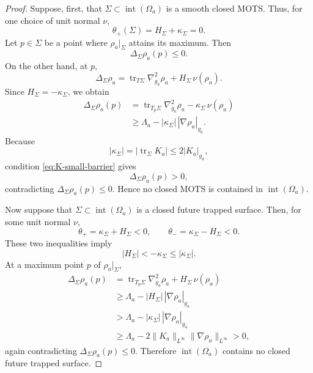 \documentclass{amsart}
\begin{document}
{\begin{proof}
\noindent Suppose, first, that \(\Sigma\subset\operatorname{int}(\Omega_a)\) is a
smooth closed MOTS. Thus, for one choice of unit normal \(\nu\),
\[
        \theta_+(\Sigma)
        =
        H_\Sigma+\kappa_\Sigma
        =
        0.
\]
Let \(p\in\Sigma\) be a point where \(\rho_a|_\Sigma\) attains its
maximum. Then
\[
        \Delta_\Sigma\rho_a(p)\le0.
\]
On the other hand, at \(p\),
\[
        \Delta_\Sigma\rho_a
        =
        \operatorname{tr}_{T\Sigma}\nabla^2_{g_a}\rho_a
        +
        H_\Sigma\,\nu(\rho_a).
\]
Since \(H_\Sigma=-\kappa_\Sigma\), we obtain
\[
\begin{aligned}
        \Delta_\Sigma\rho_a(p)
        &=
        \operatorname{tr}_{T_p\Sigma}\nabla^2_{g_a}\rho_a
        -
        \kappa_\Sigma\,\nu(\rho_a)                                      \\
        &\ge
        \Lambda_a
        -
        |\kappa_\Sigma|\,|\nabla\rho_a|_{g_a}.
\end{aligned}
\]
Because
\[
        |\kappa_\Sigma|
        =
        |\operatorname{tr}_{\Sigma}K_a|
        \le
        2|K_a|_{g_a},
\]
condition \eqref{eq:K-small-barrier} gives
\[
        \Delta_\Sigma\rho_a(p)>0,
\]
contradicting \(\Delta_\Sigma\rho_a(p)\le0\). Hence no closed MOTS is
contained in \(\operatorname{int}(\Omega_a)\).

\noindent Now suppose that \(\Sigma\subset\operatorname{int}(\Omega_a)\) is a
closed future trapped surface. Then, for some unit normal \(\nu\),
\[
        \theta_+
        =
        \kappa_\Sigma+H_\Sigma
        <0,
        \qquad
        \theta_-
        =
        \kappa_\Sigma-H_\Sigma
        <0.
\]
These two inequalities imply
\[
        |H_\Sigma|<-\kappa_\Sigma\le |\kappa_\Sigma|.
\]
At a maximum point \(p\) of \(\rho_a|_\Sigma\),
\[
\begin{aligned}
        \Delta_\Sigma\rho_a(p)
        &=
        \operatorname{tr}_{T_p\Sigma}\nabla^2_{g_a}\rho_a
        +
        H_\Sigma\,\nu(\rho_a)                                      \\
        &\ge
        \Lambda_a
        -
        |H_\Sigma|\,|\nabla\rho_a|_{g_a}                            \\
        &>
        \Lambda_a
        -
        |\kappa_\Sigma|\,|\nabla\rho_a|_{g_a}                       \\
        &\ge
        \Lambda_a
        -
        2\|K_a\|_{L^\infty}
        \|\nabla\rho_a\|_{L^\infty}
        >
        0,
\end{aligned}
\]
again contradicting \(\Delta_\Sigma\rho_a(p)\le0\). Therefore
\(\operatorname{int}(\Omega_a)\) contains no closed future trapped
surface.






\end{proof}}
\end{document}
